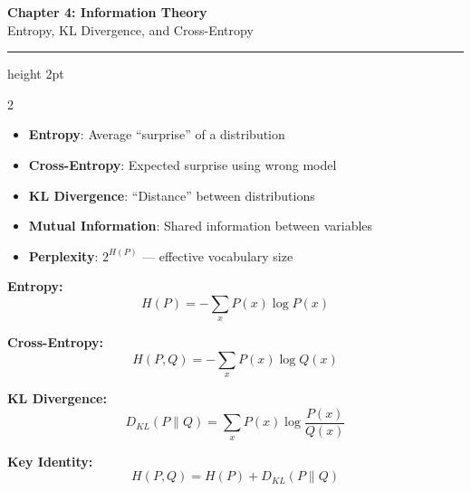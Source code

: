 \documentclass[11pt,letterpaper]{article}
\begin{document}
\begin{center}
{\LARGE\bfseries\color{primaryblue} Chapter 4: Information Theory}\\[3pt]
{\large Entropy, KL Divergence, and Cross-Entropy}
\end{center}
\vspace{-5pt}
\hrule height 2pt
\vspace{8pt}

\begin{multicols}{2}

\begin{tcolorbox}[conceptbox, title={\faLightbulb\ Key Concepts}]
\begin{itemize}
    \item \textbf{Entropy}: Average ``surprise'' of a distribution
    \item \textbf{Cross-Entropy}: Expected surprise using wrong model
    \item \textbf{KL Divergence}: ``Distance'' between distributions
    \item \textbf{Mutual Information}: Shared information between variables
    \item \textbf{Perplexity}: $2^{H(P)}$ --- effective vocabulary size
\end{itemize}
\end{tcolorbox}

\begin{tcolorbox}[formulabox, title={\faCalculator\ Core Formulas}]
\textbf{Entropy:}
\[ H(P) = -\sum_x P(x) \log P(x) \]

\textbf{Cross-Entropy:}
\[ H(P, Q) = -\sum_x P(x) \log Q(x) \]

\textbf{KL Divergence:}
\[ D_{KL}(P \| Q) = \sum_x P(x) \log \frac{P(x)}{Q(x)} \]

\textbf{Key Identity:}
\[ H(P, Q) = H(P) + D_{KL}(P \| Q) \]
\end{tcolorbox}

\columnbreak

\begin{center}
\end{center}
\end{multicols}
\end{document}

